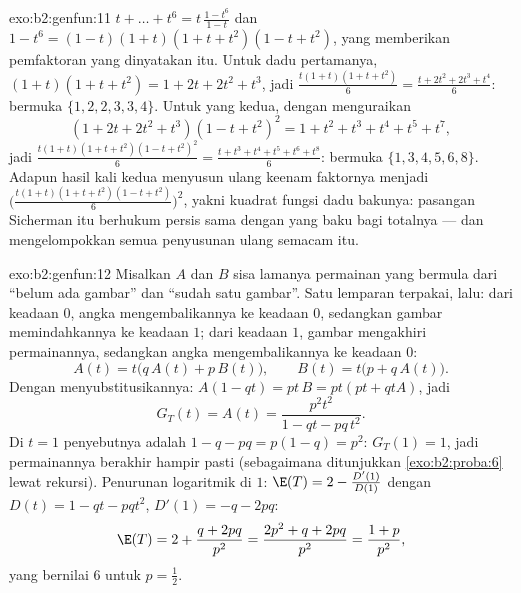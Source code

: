 \begin{solution}{exo:b2:genfun:11}
$t + \dots + t^6 = t\,\frac{1 - t^6}{1 - t}$ dan $1 - t^6 =
(1 - t)(1 + t)(1 + t + t^2)(1 - t + t^2)$, yang memberikan pemfaktoran
yang dinyatakan itu. Untuk dadu pertamanya, $(1 + t)(1 + t + t^2) = 1 +
2t + 2t^2 + t^3$, jadi $\frac{t(1+t)(1+t+t^2)}6 = \frac{t +
2t^2 + 2t^3 + t^4}6$: bermuka $\{1, 2, 2, 3, 3, 4\}$. Untuk yang
kedua, dengan menguraikan
\[
(1 + 2t + 2t^2 + t^3)(1 - t + t^2)^2 = 1 + t^2 + t^3 + t^4 +
t^5 + t^7,
\]
jadi $\frac{t(1+t)(1+t+t^2)(1-t+t^2)^2}6 = \frac{t + t^3 + t^4
+ t^5 + t^6 + t^8}6$: bermuka $\{1, 3, 4, 5, 6, 8\}$. Adapun
hasil kali kedua  menyusun ulang keenam
faktornya menjadi $\bigl(\frac{t(1+t)(1+t+t^2)(1-t+t^2)}6
\bigr)^2$, yakni kuadrat fungsi dadu bakunya: pasangan
Sicherman itu berhukum persis sama dengan yang baku bagi totalnya ---
dan  mengelompokkan semua penyusunan ulang semacam itu.
\end{solution}

\begin{solution}{exo:b2:genfun:12}
Misalkan $A$ dan $B$  sisa
lamanya permainan yang bermula dari ``belum ada gambar'' dan ``sudah satu
gambar''. Satu lemparan terpakai, lalu: dari keadaan $0$, angka
mengembalikannya ke keadaan $0$, sedangkan gambar memindahkannya ke keadaan $1$; dari keadaan
$1$, gambar mengakhiri permainannya, sedangkan angka mengembalikannya ke keadaan $0$:
\[
A(t) = t\bigl(q\,A(t) + p\,B(t)\bigr),
\qquad
B(t) = t\bigl(p + q\,A(t)\bigr).
\]
Dengan menyubstitusikannya: $A(1 - qt) = pt\,B = pt(pt + qtA)$, jadi
\[
G_T(t) = A(t) = \frac{p^2t^2}{1 - qt - pq\,t^2} .
\]
Di $t = 1$ penyebutnya adalah $1 - q - pq = p(1 - q) = p^2$:
$G_T(1) = 1$, jadi permainannya berakhir hampir pasti (sebagaimana
ditunjukkan \cref{exo:b2:proba:6} lewat rekursi). Penurunan
logaritmik di $1$: $\E(T) = 2 - \frac{D'(1)}{D(1)}$ dengan
$D(t) = 1 - qt - pqt^2$, $D'(1) = -q - 2pq$:
\[
\E(T) = 2 + \frac{q + 2pq}{p^2} = \frac{2p^2 + q + 2pq}{p^2}
= \frac{1 + p}{p^2},
\]
yang bernilai $6$ untuk $p = \frac12$.
\end{solution}

